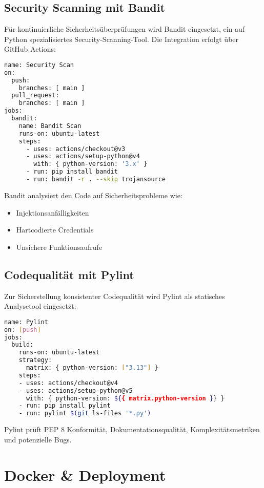 \documentclass[12pt]{scrreprt}
\begin{document}
\section{Security Scanning mit Bandit}

Für kontinuierliche Sicherheitsüberprüfungen wird Bandit eingesetzt, ein auf Python spezialisiertes Security-Scanning-Tool. Die Integration erfolgt über GitHub Actions:

\begin{lstlisting}[language= Bash, caption=Security Scan Workflow]
name: Security Scan
on:
  push:
    branches: [ main ]
  pull_request:
    branches: [ main ]
jobs:
  bandit:
    name: Bandit Scan
    runs-on: ubuntu-latest
    steps:
      - uses: actions/checkout@v3
      - uses: actions/setup-python@v4
        with: { python-version: '3.x' }
      - run: pip install bandit
      - run: bandit -r . --skip trojansource
\end{lstlisting}

Bandit analysiert den Code auf Sicherheitsprobleme wie:
\begin{itemize}
    \item Injektionsanfälligkeiten
    \item Hartcodierte Credentials
    \item Unsichere Funktionsaufrufe
\end{itemize}

\section{Codequalität mit Pylint}

Zur Sicherstellung konsistenter Codequalität wird Pylint als statisches Analysetool eingesetzt:

\begin{lstlisting}[language= Bash, caption=Pylint Workflow]
name: Pylint
on: [push]
jobs:
  build:
    runs-on: ubuntu-latest
    strategy:
      matrix: { python-version: ["3.13"] }
    steps:
    - uses: actions/checkout@v4
    - uses: actions/setup-python@v5
      with: { python-version: ${{ matrix.python-version }} }
    - run: pip install pylint
    - run: pylint $(git ls-files '*.py')
\end{lstlisting}

Pylint prüft PEP 8 Konformität, Dokumentationsqualität, Komplexitätsmetriken und potenzielle Bugs.

\chapter{Docker \& Deployment}
\end{document}
